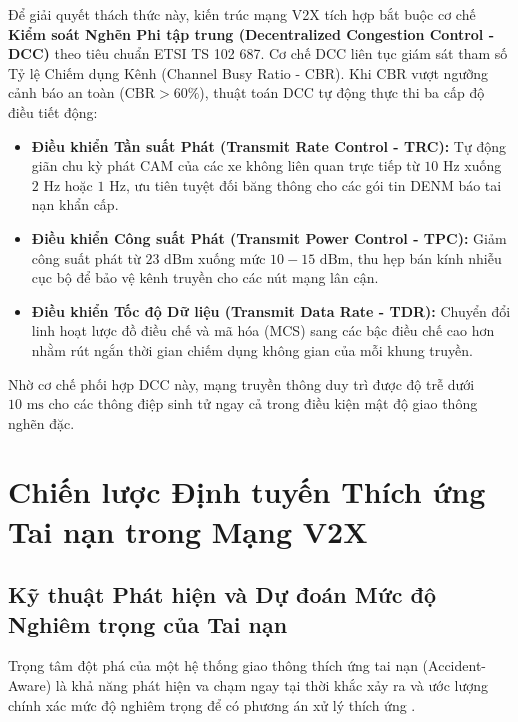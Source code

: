 \documentclass[a4paper]{article}
\begin{document}
Để giải quyết thách thức này, kiến trúc mạng V2X tích hợp bắt buộc cơ chế \textbf{Kiểm soát Nghẽn Phi tập trung (Decentralized Congestion Control - DCC)} theo tiêu chuẩn ETSI TS 102 687. Cơ chế DCC liên tục giám sát tham số Tỷ lệ Chiếm dụng Kênh (Channel Busy Ratio - CBR). Khi $\text{CBR}$ vượt ngưỡng cảnh báo an toàn ($\text{CBR} > 60\%$), thuật toán DCC tự động thực thi ba cấp độ điều tiết động:
\begin{itemize}
    \item \textbf{Điều khiển Tần suất Phát (Transmit Rate Control - TRC):} Tự động giãn chu kỳ phát CAM của các xe không liên quan trực tiếp từ $10\text{ Hz}$ xuống $2\text{ Hz}$ hoặc $1\text{ Hz}$, ưu tiên tuyệt đối băng thông cho các gói tin DENM báo tai nạn khẩn cấp.
    \item \textbf{Điều khiển Công suất Phát (Transmit Power Control - TPC):} Giảm công suất phát từ $23\text{ dBm}$ xuống mức $10 - 15\text{ dBm}$, thu hẹp bán kính nhiễu cục bộ để bảo vệ kênh truyền cho các nút mạng lân cận.
    \item \textbf{Điều khiển Tốc độ Dữ liệu (Transmit Data Rate - TDR):} Chuyển đổi linh hoạt lược đồ điều chế và mã hóa (MCS) sang các bậc điều chế cao hơn nhằm rút ngắn thời gian chiếm dụng không gian của mỗi khung truyền.
\end{itemize}
Nhờ cơ chế phối hợp DCC này, mạng truyền thông duy trì được độ trễ dưới $10\text{ ms}$ cho các thông điệp sinh tử ngay cả trong điều kiện mật độ giao thông nghẽn đặc.

\clearpage

\section{Chiến lược Định tuyến Thích ứng Tai nạn trong Mạng V2X}

\subsection{Kỹ thuật Phát hiện và Dự đoán Mức độ Nghiêm trọng của Tai nạn}
Trọng tâm đột phá của một hệ thống giao thông thích ứng tai nạn (Accident-Aware) là khả năng phát hiện va chạm ngay tại thời khắc xảy ra và ước lượng chính xác mức độ nghiêm trọng để có phương án xử lý thích ứng \cite{zohir2025nature}.
\end{document}
